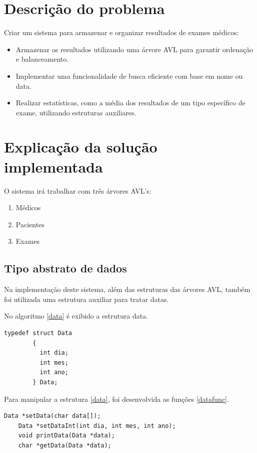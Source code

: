 \documentclass[a4paper,12pt,article]{abntex2}
\begin{document}
  \imprimirtitulo
  
  \imprimirautor

  \imprimirdata

  \section{Descrição do problema}
    Criar um sistema para armazenar e organizar resultados de exames médicos:
    \begin{itemize}
      \item Armazenar os resultados utilizando uma árvore AVL para garantir ordenação e balanceamento.
      \item Implementar uma funcionalidade de busca eficiente com base em nome ou data.
      \item Realizar estatísticas, como a média dos resultados de um tipo específico de exame, utilizando estruturas auxiliares.
    \end{itemize}
  \section{Explicação da solução implementada}
    O sistema irá trabalhar com três árvores AVL's:
    \begin{enumerate}
      \item Médicos
      \item Pacientes
      \item Exames
    \end{enumerate}
    \subsection{Tipo abstrato de dados}
      Na implementação deste sistema, além das estruturas das árvores AVL, também foi utilizada uma estrutura auxiliar para tratar datas.

      No algoritmo \ref{data} é exibido a estrutura data.

      \begin{lstlisting}[caption=Estrutura para Data, label=data, frame=single, float=h]
        typedef struct Data
        {
          int dia;
          int mes;
          int ano;
        } Data;
      \end{lstlisting}

      Para manipular a estrutura \ref{data}, foi desenvolvida as funções
      \ref{datafunc}.

      \begin{lstlisting}[float=h, caption=Funções para a manipulação da estrutura Data, label=datafunc, frame=single]
        Data *setData(char data[]);
	Data *setDataInt(int dia, int mes, int ano);
	void printData(Data *data);
	char *getData(Data *data);
      \end{lstlisting}
\end{document}
